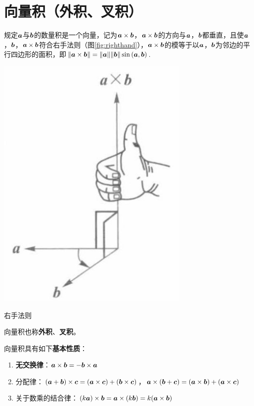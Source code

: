 \section{向量积（外积、叉积）}
\begin{definition}[向量积]
  规定$\vb*{a}$与$\vb*{b}$的数量积是一个向量，记为$\vb*{a} \times \vb*{b}$，$\vb*{a} \times \vb*{b}$的方向与$\vb*{a}$，$\vb*{b}$都垂直，且使$\vb*{a}$，$\vb*{b}$，$\vb*{a} \times \vb*{b}$符合右手法则（图\ref{fig:righthand}），$\vb*{a} \times \vb*{b}$的模等于以$\vb*{a}$，$\vb*{b}$为邻边的平行四边形的面积，即$\| \vb*{a} \times \vb*{b} \|=\| \vb*{a} \| \| \vb*{b} \| \sin{(\vb*{a},\vb*{b})}$.
\end{definition}

\begin{marginfigure}[9em]
	\includegraphics[width=\marginparwidth]{figures/right-hand.jpg}
	\caption{右手法则}
	\label{fig:righthand}
\end{marginfigure}

\par 向量积也称\textbf{外积}、\textbf{叉积}。

\par 向量积具有如下\textbf{基本性质}：
\begin{enumerate}
  \item \textbf{无交换律}：$\vb*{a} \times \vb*{b} = -\vb*{b} \times \vb*{a}$
  \item 分配律：$(\vb*{a}+\vb*{b}) \times \vb*{c} = (\vb*{a} \times \vb*{c})+ (\vb*{b} \times \vb*{c})$，$\vb*{a}\times(\vb*{b} + \vb*{c}) = (\vb*{a} \times \vb*{b})+ (\vb*{a} \times \vb*{c})$
  \item 关于数乘的结合律：$(k\vb*{a}) \times \vb*{b} = \vb*{a} \times (k\vb*{b})=k(\vb*{a} \times \vb*{b})$
\end{enumerate}


